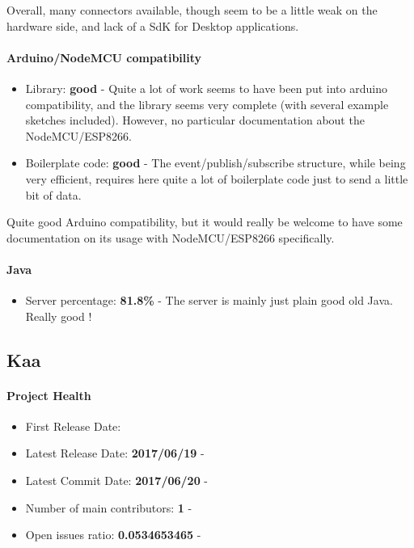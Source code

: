 \documentclass{article}
\begin{document}
Overall, many connectors available, though seem to be a little weak on the hardware side, and lack of a SdK for Desktop applications.

\paragraph{Arduino/NodeMCU compatibility}

\begin{itemize}
\item Library: \textbf{good} - Quite a lot of work seems to have been put into arduino compatibility, and the library seems very complete (with several example sketches included). However, no particular documentation about the NodeMCU/ESP8266.
\item Boilerplate code: \textbf{good} - The event/publish/subscribe structure, while being very efficient, requires here quite a lot of boilerplate code just to send a little bit of data.
\end{itemize}

Quite good Arduino compatibility, but it would really be welcome to have some documentation on its usage with NodeMCU/ESP8266 specifically.

\paragraph{Java} 

\begin{itemize}
\item Server percentage: \textbf{81.8\%} - The server is mainly just plain good old Java. Really good !
\end{itemize}

\subsection{Kaa}

\paragraph{Project Health}

\begin{itemize}
\item First Release Date: 
\item Latest Release Date: \textbf{2017/06/19} - 
\item Latest Commit Date: \textbf{2017/06/20} - 
\item Number of main contributors: \textbf{1} - 
\item Open issues ratio: \textbf{0.0534653465} - 
\end{itemize}
\end{document}
